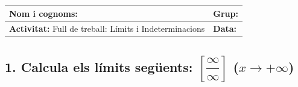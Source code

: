 \documentclass[12pt,a4paper]{article}
\begin{document}
\begingroup
\renewcommand{\arraystretch}{2.2}
\begin{tabularx}{\textwidth}{|X|p{4cm}|}
    \hline
    \textbf{Nom i cognoms:} & \textbf{Grup:} \\ \hline
    \textbf{Activitat:} Full de treball: Límits i Indeterminacions & \textbf{Data:} \\ \hline
\end{tabularx}
\endgroup

\vspace{0.6cm}

\subsection*{1. Calcula els límits següents: $\left[\dfrac{\infty}{\infty}\right]$ \quad ($x \to +\infty$)}
\end{document}
